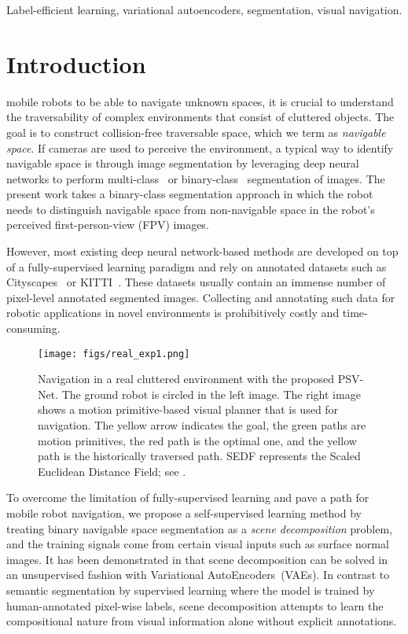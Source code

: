 \documentclass[letterpaper, 10 pt, journal, twoside]{ieeetran}
\begin{document}
\begin{IEEEkeywords}
Label-efficient learning, variational autoencoders, segmentation, visual navigation.
\end{IEEEkeywords}

\section{Introduction}
 mobile robots to be able to navigate unknown spaces, it is crucial to 
understand the traversability of complex environments that consist of cluttered objects. The goal is to construct collision-free traversable space, which we term as {\em navigable space}. 
If cameras are used to perceive the environment, a typical way to identify navigable space is through image segmentation by leveraging deep neural networks  to perform multi-class~\cite{yang2018denseaspp} or binary-class~\cite{fan2020sne} segmentation of images. 
The present work takes a binary-class segmentation approach in which the robot needs to distinguish navigable space from non-navigable space in the robot's perceived first-person-view (FPV) images.

However, most existing deep neural network-based methods are developed on top of a fully-supervised learning paradigm and rely on annotated datasets such as Cityscapes~\cite{cordts2015cityscapes} or KITTI~\cite{geiger2013vision}. These datasets usually contain an immense number of pixel-level annotated segmented images. Collecting and annotating such data for robotic applications in novel environments is prohibitively costly and time-consuming. 

\begin{figure} 
{
\centering
  {\texttt{[image: figs/real\_exp1.png]}}
\caption{\small Navigation in a real cluttered environment with the proposed PSV-Net. The ground robot is circled in the left image. The right image shows  a motion primitive-based visual planner \cite{chen2022cali} that is used for navigation. The yellow arrow indicates the goal, the green paths are motion primitives, the red path is the optimal one, and the yellow path is the historically traversed path. SEDF represents the Scaled Euclidean Distance Field; see \cite{chen2022cali}. \vspace{-15pt}
} 
\label{fig:real_exp1}  
} 
\end{figure}

To overcome the limitation of fully-supervised learning and pave a path for mobile robot navigation, we propose   a self-supervised learning method by treating  binary navigable space segmentation as a {\em scene decomposition} problem, and the training signals come from certain visual inputs such as surface normal images. It has been demonstrated in \cite{burgess2019monet, greff2019multi} that  scene decomposition can be solved in an unsupervised fashion with Variational AutoEncoders~(VAEs). In contrast to semantic segmentation by supervised learning where the model is trained by human-annotated pixel-wise labels, scene decomposition attempts to learn the compositional nature from  visual information alone without explicit annotations.
\end{document}

